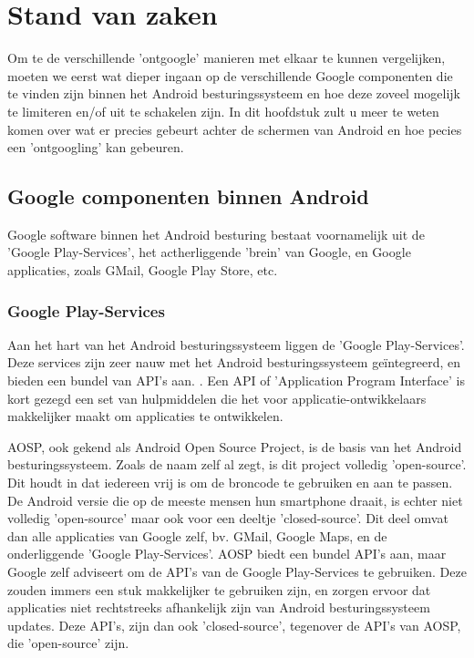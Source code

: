 \chapter{Stand van zaken}
\label{ch:stand-van-zaken}



Om te de verschillende 'ontgoogle' manieren met elkaar te kunnen vergelijken, moeten we eerst wat dieper ingaan op de verschillende Google componenten die te vinden zijn binnen het Android besturingssysteem en hoe deze zoveel mogelijk te limiteren en/of uit te schakelen zijn. In dit hoofdstuk zult u meer te weten komen over wat er precies gebeurt achter de schermen van Android en hoe pecies een 'ontgoogling' kan gebeuren.

\section{Google componenten binnen Android}

Google software binnen het Android besturing bestaat voornamelijk uit de 'Google Play-Services', het actherliggende 'brein' van Google, en Google applicaties, zoals GMail, Google Play Store, etc.

\subsection{Google Play-Services}

Aan het hart van het Android besturingssysteem liggen de 'Google Play-Services'. Deze services zijn zeer nauw met het Android besturingssysteem geïntegreerd, en bieden een bundel van API's aan. \autocite{marshall_google-play-services}. Een API of 'Application Program Interface' is kort gezegd een set van hulpmiddelen die het voor applicatie-ontwikkelaars makkelijker maakt om applicaties te ontwikkelen. \autocite{beal_api}

AOSP, ook gekend als Android Open Source Project, is de basis van het Android besturingssysteem. Zoals de naam zelf al zegt, is dit project volledig 'open-source'. Dit houdt in dat iedereen vrij is om de broncode te gebruiken en aan te passen. De Android versie die op de meeste mensen hun smartphone draait, is echter niet volledig 'open-source' maar ook voor een deeltje 'closed-source'. Dit deel omvat dan alle applicaties van Google zelf, bv. GMail, Google Maps, en de onderliggende 'Google Play-Services'. \autocite{amadeo_open-source} AOSP biedt een bundel API's  aan, maar Google zelf adviseert om de API's van de Google Play-Services te gebruiken. Deze zouden immers een stuk makkelijker te gebruiken zijn, en zorgen ervoor dat applicaties niet rechtstreeks afhankelijk zijn van Android besturingssysteem updates. \autocite{marshall_google-play-services} Deze API's, zijn dan ook 'closed-source', tegenover de API's van AOSP, die 'open-source' zijn.  

